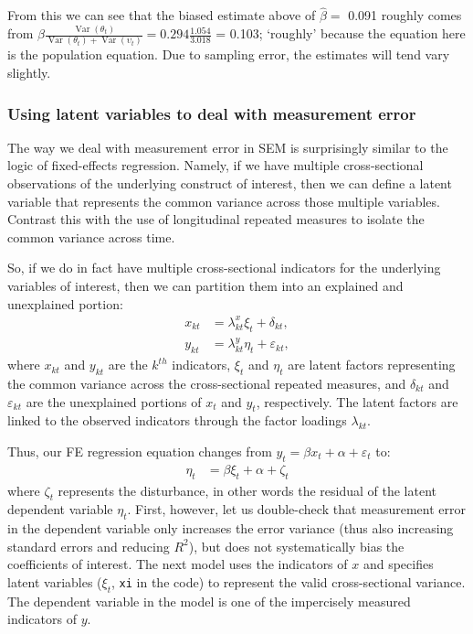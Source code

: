 \documentclass[]{interact}
\theoremstyle{plain}%
\theoremstyle{definition}
\theoremstyle{remark}
\begin{document}
\doublespacing

From this we can see that the biased estimate above of \(\hat{\beta} =\)
0.091 roughly comes from
\(\beta \frac{\mathop{\mathrm{\mathrm{Var}}}(\theta_{t})}{\mathop{\mathrm{\mathrm{Var}}}(\theta_{t}) + \mathop{\mathrm{\mathrm{Var}}}(\upsilon_{t})} = 0.294 \frac{1.054}{3.018}\)
= 0.103; `roughly' because the equation here is the population equation.
Due to sampling error, the estimates will tend vary slightly.

\hypertarget{using-latent-variables-to-deal-with-measurement-error}{%
\subsubsection{Using latent variables to deal with measurement
error}\label{using-latent-variables-to-deal-with-measurement-error}}

The way we deal with measurement error in SEM is surprisingly similar to
the logic of fixed-effects regression. Namely, if we have multiple
cross-sectional observations of the underlying construct of interest,
then we can define a latent variable that represents the common variance
across those multiple variables. Contrast this with the use of
longitudinal repeated measures to isolate the common variance across
time.

So, if we do in fact have multiple cross-sectional indicators for the
underlying variables of interest, then we can partition them into an
explained and unexplained portion:\\
\begin{align}
x_{kt} & = \lambda_{kt}^{x}\xi_{t} + \delta_{kt}, \\
y_{kt} & = \lambda_{kt}^{y}\eta_{t} + \varepsilon_{kt},
\end{align} where \(x_{kt}\) and \(y_{kt}\) are the \(k^{th}\)
indicators, \(\xi_{t}\) and \(\eta_{t}\) are latent factors representing
the common variance across the cross-sectional repeated measures, and
\(\delta_{kt}\) and \(\varepsilon_{kt}\) are the unexplained portions of
\(x_{t}\) and \(y_{t}\), respectively. The latent factors are linked to
the observed indicators through the factor loadings \(\lambda_{kt}\).

Thus, our FE regression equation changes from
\(y_{t} = \beta x_{t} + \alpha + \varepsilon_{t}\) to: \begin{align}
\eta_{t} & = \beta \xi_{t} + \alpha + \zeta_{t}
\end{align} where \(\zeta_{t}\) represents the disturbance, in other
words the residual of the latent dependent variable \(\eta_{t}\). First,
however, let us double-check that measurement error in the dependent
variable only increases the error variance (thus also increasing
standard errors and reducing \(R^{2}\)), but does not systematically
bias the coefficients of interest. The next model uses the indicators of
\(x\) and specifies latent variables (\(\xi_{t}\), \texttt{xi} in the
code) to represent the valid cross-sectional variance. The dependent
variable in the model is one of the impercisely measured indicators of
\(y\).
\end{document}
